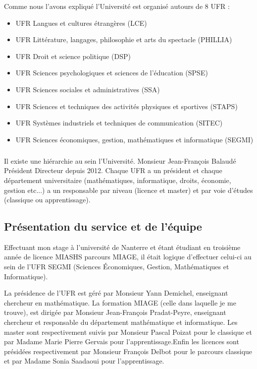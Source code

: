 \documentclass[a4paper, 12pt, twoside]{article}
\begin{document}
Comme nous l'avons expliqué l'Université est organisé autours de 8 UFR : \vspace{0.4 cm}
\begin{itemize}
\item UFR Langues et cultures étrangères \textsf{(LCE)} 
\item UFR Littérature, langages, philosophie et arts du spectacle \textsf{(PHILLIA)}
\item UFR Droit et science politique \textsf{(DSP)}
\item UFR Sciences psychologiques et sciences de l'éducation \textsf{(SPSE)}
\item UFR Sciences sociales et administratives \textsf{(SSA)}
\item UFR Sciences et techniques des activités physiques et sportives \textsf{(STAPS)}
\item UFR Systèmes industriels et techniques de communication \textsf{(SITEC)}
\item UFR Sciences économiques, gestion, mathématiques et informatique \textsf{(SEGMI)} 
\end{itemize}
\subparagraph*{}{Il existe une hiérarchie au sein l'Université. Monsieur \textsf{Jean-François Balaudé} Président Directeur depuis 2012. Chaque UFR a un président et chaque département universitaire (mathématiques, informatique, droits, économie, gestion etc...)  a un responsable par niveau (licence et master) et par voie d'études (classique ou apprentissage).}

\subsection{Présentation du service et de l'équipe}
Effectuant mon stage à l'université de Nanterre et étant étudiant en troisième année de licence MIASHS parcours MIAGE, il était logique d'effectuer celui-ci au sein de l'UFR \textsf{SEGMI} (Sciences Économiques, Gestion, Mathématiques et Informatique). \newline

La présidence de l'UFR est géré par Monsieur \textsf{Yann Demichel}, enseignant chercheur en mathématique. La formation MIAGE (celle dans laquelle je me trouve), est dirigée par Monsieur \textsf{Jean-François Pradat-Peyre}, enseignant chercheur et responsable du département mathématique et informatique. Les master sont respectivement suivis par  Monsieur \textsf{Pascal Poizat} pour le classique et par  Madame \textsf{Marie Pierre Gervais} pour l'apprentissage.Enfin les licences sont présidées respectivement par Monsieur \textsf{François Delbot} pour le parcours classique et par Madame \textsf{Sonia Saadaoui} pour l'apprentissage. \newline
\end{document}
